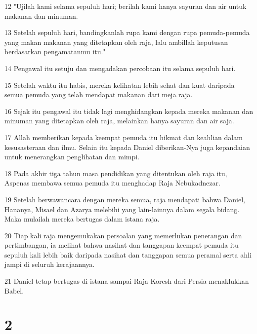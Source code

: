 \par 12 "Ujilah kami selama sepuluh hari; berilah kami hanya sayuran dan air untuk makanan dan minuman.
\par 13 Setelah sepuluh hari, bandingkanlah rupa kami dengan rupa pemuda-pemuda yang makan makanan yang ditetapkan oleh raja, lalu ambillah keputusan berdasarkan pengamatanmu itu."
\par 14 Pengawal itu setuju dan mengadakan percobaan itu selama sepuluh hari.
\par 15 Setelah waktu itu habis, mereka kelihatan lebih sehat dan kuat daripada semua pemuda yang telah mendapat makanan dari meja raja.
\par 16 Sejak itu pengawal itu tidak lagi menghidangkan kepada mereka makanan dan minuman yang ditetapkan oleh raja, melainkan hanya sayuran dan air saja.
\par 17 Allah memberikan kepada keempat pemuda itu hikmat dan keahlian dalam kesusasteraan dan ilmu. Selain itu kepada Daniel diberikan-Nya juga kepandaian untuk menerangkan penglihatan dan mimpi.
\par 18 Pada akhir tiga tahun masa pendidikan yang ditentukan oleh raja itu, Aspenas membawa semua pemuda itu menghadap Raja Nebukadnezar.
\par 19 Setelah berwawancara dengan mereka semua, raja mendapati bahwa Daniel, Hananya, Misael dan Azarya melebihi yang lain-lainnya dalam segala bidang. Maka mulailah mereka bertugas dalam istana raja.
\par 20 Tiap kali raja mengemukakan persoalan yang memerlukan penerangan dan pertimbangan, ia melihat bahwa nasihat dan tanggapan keempat pemuda itu sepuluh kali lebih baik daripada nasihat dan tanggapan semua peramal serta ahli jampi di seluruh kerajaannya.
\par 21 Daniel tetap bertugas di istana sampai Raja Koresh dari Persia menaklukkan Babel.

\chapter{2}

